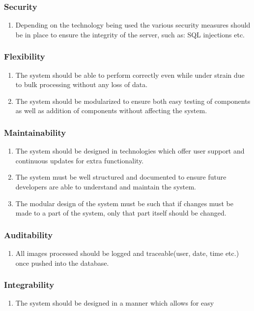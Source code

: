 \subsubsection{Security}
\begin{enumerate}
	\item Depending on the technology being used the various security measures should be in place to ensure the integrity of the server, such as: SQL injections etc.
\end{enumerate}
\subsubsection{Flexibility}
\begin{enumerate}
	\item The system should be able to perform correctly even while under strain due to bulk processing without any loss of data.
	\item The system should be modularized to ensure both easy testing of components as well as addition of components without affecting the system.
\end{enumerate}
\subsubsection{Maintainability}
\begin{enumerate}
	\item The system should be designed in technologies which offer user support and continuous updates for extra functionality.
	\item The system must be well structured and documented to ensure future developers are able to understand and maintain the system.
	\item The modular design of the system must be such that if changes must be made to a part of the system, only that part itself should be changed.
\end{enumerate}
\subsubsection{Auditability}
\begin{enumerate}
	\item All images processed should be logged and traceable(user, date, time etc.) once pushed into the database.
\end{enumerate}
\subsubsection{Integrability}
\begin{enumerate}
	\item The system should be designed in a manner which allows for easy 
\end{enumerate}

